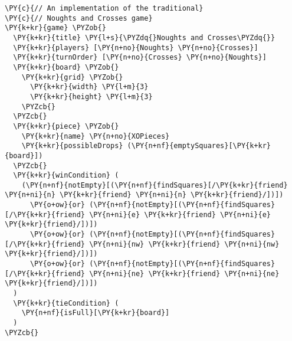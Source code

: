 \begin{Verbatim}[commandchars=\\\{\}]
\PY{c}{// An implementation of the traditional}
\PY{c}{// Noughts and Crosses game}
\PY{k+kr}{game} \PYZob{}
  \PY{k+kr}{title} \PY{l+s}{\PYZdq{}Noughts and Crosses\PYZdq{}}
  \PY{k+kr}{players} [\PY{n+no}{Noughts} \PY{n+no}{Crosses}]
  \PY{k+kr}{turnOrder} [\PY{n+no}{Crosses} \PY{n+no}{Noughts}]
  \PY{k+kr}{board} \PYZob{}
    \PY{k+kr}{grid} \PYZob{}
      \PY{k+kr}{width} \PY{l+m}{3}
      \PY{k+kr}{height} \PY{l+m}{3}
    \PYZcb{}
  \PYZcb{}
  \PY{k+kr}{piece} \PYZob{}
    \PY{k+kr}{name} \PY{n+no}{XOPieces}
    \PY{k+kr}{possibleDrops} (\PY{n+nf}{emptySquares}[\PY{k+kr}{board}])
  \PYZcb{}
  \PY{k+kr}{winCondition} (
    (\PY{n+nf}{notEmpty}[(\PY{n+nf}{findSquares}[/\PY{k+kr}{friend} \PY{n+ni}{n} \PY{k+kr}{friend} \PY{n+ni}{n} \PY{k+kr}{friend}/])])
      \PY{o+ow}{or} (\PY{n+nf}{notEmpty}[(\PY{n+nf}{findSquares}[/\PY{k+kr}{friend} \PY{n+ni}{e} \PY{k+kr}{friend} \PY{n+ni}{e} \PY{k+kr}{friend}/])])
      \PY{o+ow}{or} (\PY{n+nf}{notEmpty}[(\PY{n+nf}{findSquares}[/\PY{k+kr}{friend} \PY{n+ni}{nw} \PY{k+kr}{friend} \PY{n+ni}{nw} \PY{k+kr}{friend}/])])
      \PY{o+ow}{or} (\PY{n+nf}{notEmpty}[(\PY{n+nf}{findSquares}[/\PY{k+kr}{friend} \PY{n+ni}{ne} \PY{k+kr}{friend} \PY{n+ni}{ne} \PY{k+kr}{friend}/])])
  )
  \PY{k+kr}{tieCondition} (
    \PY{n+nf}{isFull}[\PY{k+kr}{board}]
  )
\PYZcb{}
\end{Verbatim}
